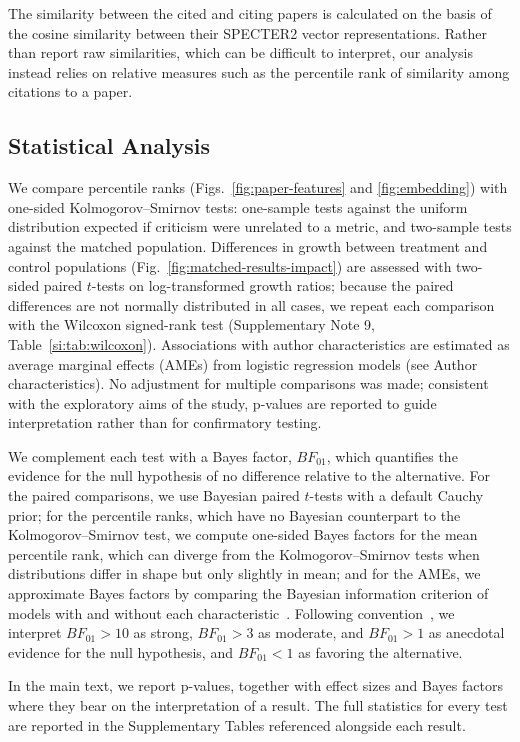 \documentclass[12pt,a4paper]{article}
\numberwithin{equation}{section}
\begin{document}
The similarity between the cited and citing papers is calculated on the basis of the cosine similarity between their SPECTER2 vector representations.
Rather than report raw similarities, which can be difficult to interpret, our analysis instead relies on relative measures such as the percentile rank of similarity among citations to a paper. 


\subsection*{Statistical Analysis}
We compare percentile ranks (Figs.~\ref*{fig:paper-features} and \ref*{fig:embedding}) with one-sided Kolmogorov--Smirnov tests: one-sample tests against the uniform distribution expected if criticism were unrelated to a metric, and two-sample tests against the matched population.
Differences in growth between treatment and control populations (Fig.~\ref*{fig:matched-results-impact}) are assessed with two-sided paired $t$-tests on log-transformed growth ratios; because the paired differences are not normally distributed in all cases, we repeat each comparison with the Wilcoxon signed-rank test (Supplementary Note 9, Table~\ref*{si:tab:wilcoxon}).
Associations with author characteristics are estimated as average marginal effects (AMEs) from logistic regression models (see Author characteristics).
No adjustment for multiple comparisons was made; consistent with the exploratory aims of the study, p-values are reported to guide interpretation rather than for confirmatory testing.

We complement each test with a Bayes factor, $BF_{01}$, which quantifies the evidence for the null hypothesis of no difference relative to the alternative.
For the paired comparisons, we use Bayesian paired $t$-tests with a default Cauchy prior; for the percentile ranks, which have no Bayesian counterpart to the Kolmogorov--Smirnov test, we compute one-sided Bayes factors for the mean percentile rank, which can diverge from the Kolmogorov--Smirnov tests when distributions differ in shape but only slightly in mean; and for the AMEs, we approximate Bayes factors by comparing the Bayesian information criterion of models with and without each characteristic~\cite{wagenmakers2007practical}.
Following convention~\cite{jeffreys1961theory}, we interpret $BF_{01} > 10$ as strong, $BF_{01} > 3$ as moderate, and $BF_{01} > 1$ as anecdotal evidence for the null hypothesis, and $BF_{01} < 1$ as favoring the alternative.

In the main text, we report p-values, together with effect sizes and Bayes factors where they bear on the interpretation of a result.
The full statistics for every test are reported in the Supplementary Tables referenced alongside each result.
\end{document}
